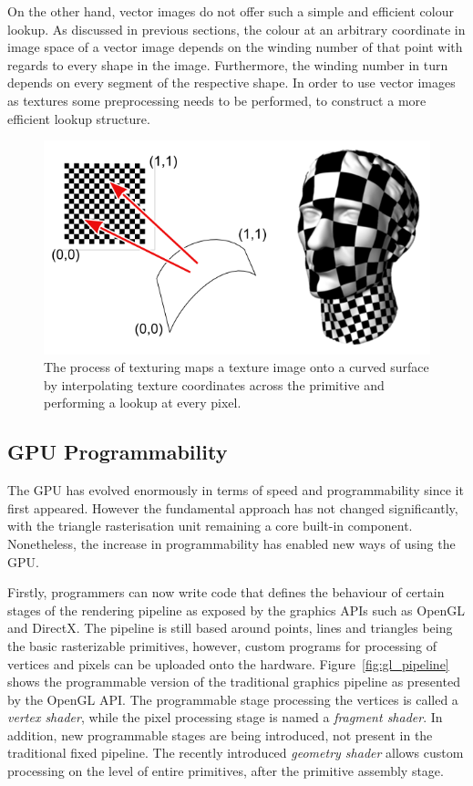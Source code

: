 \documentclass[11pt,a4paper,twoside]{article}
\begin{document}
On the other hand, vector images do not offer such a simple and efficient colour lookup. As discussed in previous sections, the colour at an arbitrary coordinate in image space of a vector image depends on the winding number of that point with regards to every shape in the image. Furthermore, the winding number in turn depends on every segment of the respective shape. In order to use vector images as textures some preprocessing needs to be performed, to construct a more efficient lookup structure.

\begin {figure}
	\centering
	\includegraphics [width=0.6\columnwidth]{figures/texturing}
	\caption {The process of texturing maps a texture image onto a curved surface by interpolating texture coordinates across the primitive and performing a lookup at every pixel.}
	\label {fig:texturing}
\end {figure}

\subsection{GPU Programmability}
The GPU has evolved enormously in terms of speed and programmability since it first appeared. However the fundamental approach has not changed significantly, with the triangle rasterisation unit remaining a core built-in component. Nonetheless, the increase in programmability has enabled new ways of using the GPU.

Firstly, programmers can now write code that defines the behaviour of certain stages of the rendering pipeline as exposed by the graphics APIs such as OpenGL and DirectX. The pipeline is still based around points, lines and triangles being the basic rasterizable primitives, however, custom programs for processing of vertices and pixels can be uploaded onto the hardware. Figure~\ref{fig:gl_pipeline} shows the programmable version of the traditional graphics pipeline as presented by the OpenGL API. The programmable stage processing the vertices is called a \emph{vertex shader}, while the pixel processing stage is named a \emph{fragment shader}. In addition, new programmable stages are being introduced, not present in the traditional fixed pipeline. The recently introduced \emph{geometry shader} allows custom processing on the level of entire primitives, after the primitive assembly stage.
\end{document}
